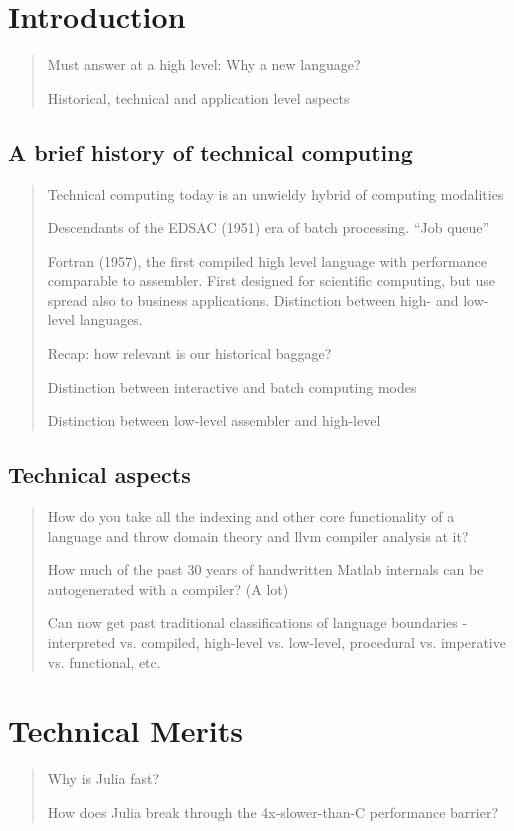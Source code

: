 \documentclass[12pt]{mitthesis}
\begin{document}

\pagestyle{plain}


\part{Introduction}
\begin{quotation}
Must answer at a high level: Why a new language?

Historical, technical and application level aspects
\end{quotation}

\chapter{A brief history of technical computing}
\begin{quotation}
Technical computing today is an unwieldy hybrid of computing modalities

Descendants of the EDSAC (1951) era of batch processing. ``Job queue''

Fortran (1957), the first compiled high level language with performance
comparable to assembler. First designed for scientific computing,
but use spread also to business applications. Distinction between
high- and low-level languages.

Recap: how relevant is our historical baggage?

Distinction between interactive and batch computing modes

Distinction between low-level assembler and high-level
\end{quotation}

\chapter{Technical aspects}
\begin{quotation}
How do you take all the indexing and other core functionality of a
language and throw domain theory and llvm compiler analysis at it?

How much of the past 30 years of handwritten Matlab internals can
be autogenerated with a compiler? (A lot)

Can now get past traditional classifications of language boundaries
- interpreted vs. compiled, high-level vs. low-level, procedural vs.
imperative vs. functional, etc.
\end{quotation}

\part{Technical Merits}
\begin{quotation}
Why is Julia fast?

How does Julia break through the 4x-slower-than-C performance barrier?
\end{quotation}
\end{document}
